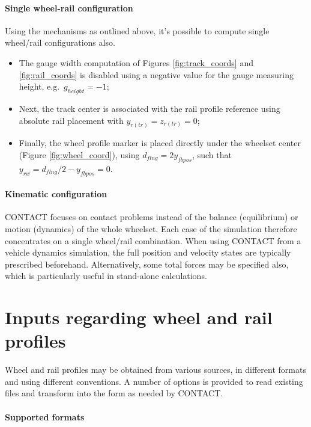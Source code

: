 \documentclass[12pt]{report}
\begin{document}
\paragraph{Single wheel-rail configuration}

Using the mechanisms as outlined above, it's possible to compute 
single wheel/rail configurations also.
\begin{itemize}
\item The gauge width computation of Figures \ref{fig:track_coords} and
        \ref{fig:rail_coords} is disabled using a negative value for the
        gauge measuring height, e.g.\ $g_{height}=-1$;
\item Next, the track center is associated with the rail profile reference
        using absolute rail placement with $y_{r(tr)}=z_{r(tr)}=0$;
\item Finally, the wheel profile marker is placed directly under the
        wheelset center (Figure \ref{fig:wheel_coord}), using
        $d_{flng}=2 y_{fbpos}$, such that $y_{rw}=d_{flng}/2-y_{fbpos}=0$.
\end{itemize}

\paragraph{Kinematic configuration}

CONTACT focuses on contact problems instead of the balance (equilibrium)
or motion (dynamics) of the whole wheelset. Each case of the simulation
therefore concentrates on a single wheel/rail combination. When using
CONTACT from a vehicle dynamics simulation, the full position and velocity
states are typically prescribed beforehand. Alternatively, some
total forces may be specified also, which is particularly useful in
stand-alone calculations.

\section{Inputs regarding wheel and rail profiles}
\label{sec:profiles}

Wheel and rail profiles may be obtained from various sources, in different
formats and using different conventions. A number of options is provided
to read existing files and transform into the form as needed by CONTACT.

\paragraph{Supported formats}
\end{document}
